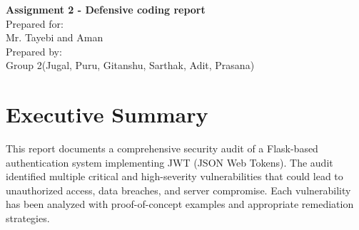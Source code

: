 \documentclass[11pt,a4paper]{article}
\begin{document}
\begin{titlepage}

    \centering
    \vspace*{8cm}
    {\Huge\bfseries Assignment 2 - Defensive coding report\\}
    \vspace{1.5cm}
    \vspace{1cm}
    \vfill
    {\large Prepared for:\\
    Mr. Tayebi and Aman\\}
    \vspace{0.5cm}
    {\large Prepared by:\\
    Group 2(Jugal, Puru, Gitanshu, Sarthak, Adit, Prasana)\\}
\end{titlepage}

\tableofcontents
\newpage

\section{Executive Summary}

This report documents a comprehensive security audit of a Flask-based authentication system implementing JWT (JSON Web Tokens). The audit identified multiple critical and high-severity vulnerabilities that could lead to unauthorized access, data breaches, and server compromise. Each vulnerability has been analyzed with proof-of-concept examples and appropriate remediation strategies.
\end{document}

